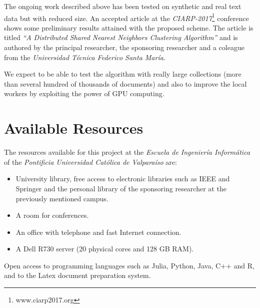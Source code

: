\documentclass[10pt]{article}
\begin{document}

The ongoing work described above has been tested on synthetic and real text data but with reduced size. An accepted article at the \textit{CIARP-2017}\footnote{www.ciarp2017.org} conference shows some preliminary results attained with the proposed scheme. The article is titled \textit{``A Distributed Shared Nearest Neighbors Clustering Algorithm''} and is authored by the principal researcher, the sponsoring researcher and a coleague from the \textit{Universidad T\'ecnica Federico Santa Mar\'ia}.

We expect to be able to test the algorithm with really large collections (more than several hundred of thousands of documents) and also to improve the local workers by exploiting the power of GPU computing. 


\section{Available Resources}
The resources available for this project at the \textit{Escuela de Ingeniería Informática} of the \textit{Pontificia Universidad Católica de Valparaíso} are:

\begin{itemize}
    \item University library, free access to electronic libraries such as IEEE and Springer and the personal library of the sponsoring researcher at the previously mentioned campus.
    \item A room for conferences.
    \item An office with telephone and fast Internet connection.
    \item A Dell R730 server (20 physical cores and 128 GB RAM).
\end{itemize}

Open access to programming languages such as Julia, Python, Java, C++ and R, and to the Latex document preparation system.
\end{document}
